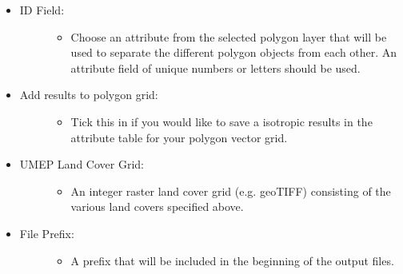 \documentclass[letterpaper,10pt,english]{sphinxmanual}
\begin{document}
\begin{itemize}
\begin{description}
\end{description}

\item {} \begin{description}
\item[{ID Field:}] \leavevmode\begin{itemize}
\item {} 
Choose an attribute from the selected polygon layer that will be used to separate the different polygon objects from each other. An attribute field of unique numbers or letters should be used.

\end{itemize}

\end{description}

\item {} \begin{description}
\item[{Add results to polygon grid:}] \leavevmode\begin{itemize}
\item {} 
Tick this in if you would like to save a isotropic results in the attribute table for your polygon vector grid.

\end{itemize}

\end{description}

\item {} \begin{description}
\item[{UMEP Land Cover Grid:}] \leavevmode\begin{itemize}
\item {} 
An integer raster land cover grid (e.g. geoTIFF) consisting of the various land covers specified above.

\end{itemize}

\end{description}

\item {} \begin{description}
\item[{File Prefix:}] \leavevmode\begin{itemize}
\item {} 
A prefix that will be included in the beginning of the output files.

\end{itemize}

\end{description}


\end{itemize}
\end{document}
